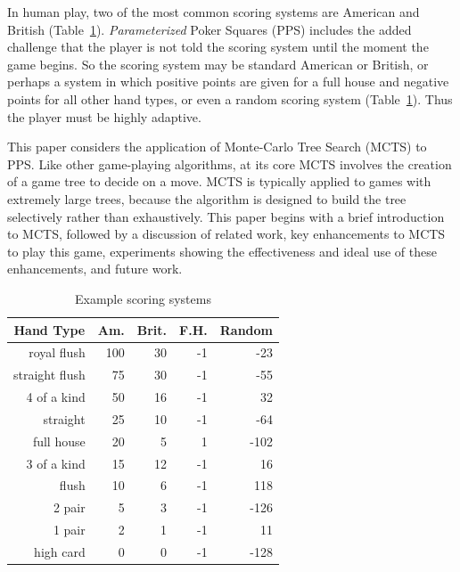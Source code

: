 \documentclass[letterpaper]{article}
\begin{document}
In human play, two of the most common scoring systems are American and British (Table~\ref{tbl:scoring}). {\it Parameterized} Poker Squares (PPS) includes the added challenge that the player is not told the scoring system until the moment the game begins. So the scoring system may be standard American or British, or perhaps a system in which positive points are given for a full house and negative points for all other hand types, or even a random scoring system (Table~\ref{tbl:scoring}). Thus the player must be highly adaptive.


This paper considers the application of Monte-Carlo Tree Search (MCTS) to PPS. Like other game-playing algorithms, at its core MCTS involves the creation of a game tree to decide on a move. MCTS is typically applied to games with extremely large trees, because the algorithm is designed to build the tree selectively rather than exhaustively. This paper begins with a brief introduction to MCTS, followed by a discussion of related work, key enhancements to MCTS to play this game, experiments showing the effectiveness and ideal use of these enhancements, and future work.

\begin{table}
\caption{Example scoring systems}
\label{tbl:scoring}
\centering
\begin{tabular}{r r r r r}
\hline
\multicolumn{1}{c}{\textbf{Hand Type}} & 
\multicolumn{1}{c}{\textbf{Am.}} & 
\multicolumn{1}{c}{\textbf{Brit.}} & 
\multicolumn{1}{c}{\textbf{F.H.}} & 
\multicolumn{1}{c}{\textbf{Random}} \\
\hline
royal flush     & 100 & 30 & -1 & -23 \\
straight flush & 75 & 30 & -1 & -55 \\
4 of a kind    & 50 & 16 & -1 & 32 \\
straight        & 25 & 10 & -1 & -64 \\
full house     & 20 & 5  & 1 & -102 \\
3 of a kind   & 15 & 12 & -1 & 16 \\
flush           & 10 & 6   & -1 & 118 \\
2 pair         & 5   & 3   & -1 & -126 \\
1 pair         & 2   & 1   & -1 & 11 \\
high card    & 0   & 0   & -1 & -128 \\
\hline
\end{tabular}
\end{table}
\end{document}
